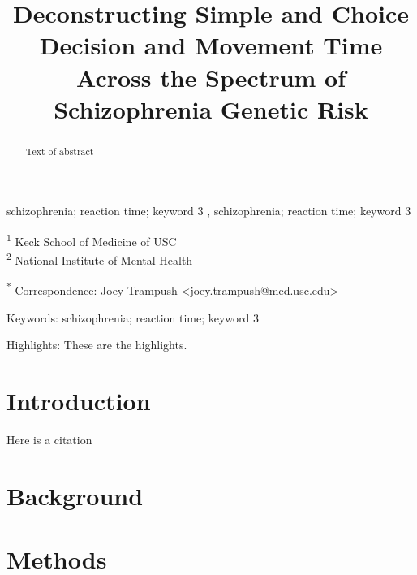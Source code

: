 \documentclass[
  number]{elsarticle}
\begin{document}
\begin{frontmatter}
\title{Deconstructing Simple and Choice Decision and Movement Time
Across the Spectrum of Schizophrenia Genetic Risk}


        
\begin{abstract}
Text of abstract
\end{abstract}





\begin{keyword}
    schizophrenia; reaction time; keyword 3 \sep 
    schizophrenia; reaction time; keyword 3
\end{keyword}
\end{frontmatter}
    \ifdefined\Shaded\renewenvironment{Shaded}{\begin{tcolorbox}[interior hidden, borderline west={3pt}{0pt}{shadecolor}, sharp corners, enhanced, boxrule=0pt, frame hidden, breakable]}{\end{tcolorbox}}\fi

\textsuperscript{1} Keck School of Medicine of USC\\
\textsuperscript{2} National Institute of Mental Health

\textsuperscript{*} Correspondence:
\href{mailto:joey.trampush@med.usc.edu}{Joey Trampush
\textless{}joey.trampush@med.usc.edu\textgreater{}}

Keywords: schizophrenia; reaction time; keyword 3

Highlights: These are the highlights.

\hypertarget{introduction}{%
\section{Introduction}\label{introduction}}

Here is a citation \citep{Marwick2017}

\hypertarget{background}{%
\section{Background}\label{background}}

\hypertarget{methods}{%
\section{Methods}\label{methods}}
\end{document}
